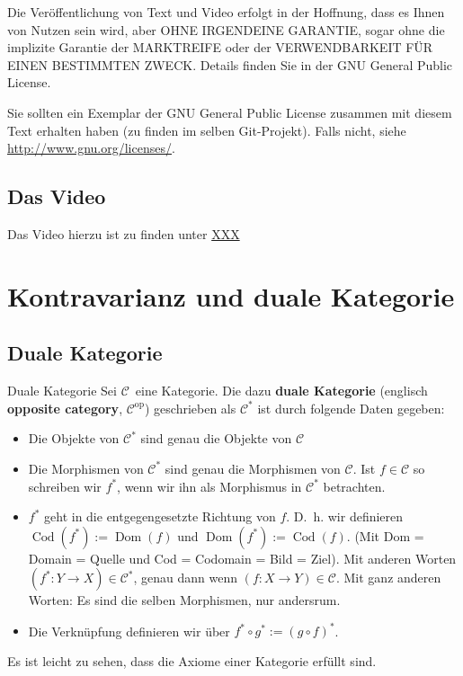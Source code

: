\documentclass[a4paper]{amsart}
\theoremstyle{definition}
\DeclareMathOperator{\Dom}{Dom}
\DeclareMathOperator{\Cod}{Cod}
\newcommand{\CC}{\ensuremath{\mathcal{ C }}}
\begin{document}
Die Veröffentlichung von Text und Video erfolgt in der Hoffnung, dass es Ihnen von Nutzen sein wird,
aber OHNE IRGENDEINE GARANTIE, sogar ohne die implizite Garantie der MARKTREIFE oder der
VERWENDBARKEIT FÜR EINEN BESTIMMTEN ZWECK. Details finden Sie in der GNU General Public License.

Sie sollten ein Exemplar der GNU General Public License zusammen mit diesem Text erhalten haben
(zu finden im selben Git-Projekt).
Falls nicht, siehe \url{http://www.gnu.org/licenses/}.

\subsection*{Das Video}
Das Video hierzu ist zu finden unter
{\tiny
   \url{XXX}
}

\section{Kontravarianz und duale Kategorie}

\subsection{Duale Kategorie}
\begin{Definition}{Duale Kategorie}
   Sei \CC\ eine Kategorie. Die dazu \textbf{duale Kategorie} (englisch \textbf{opposite category}, $\CC^\text{op}$) geschrieben als $\CC^*$ ist durch folgende Daten gegeben:
   \begin{itemize}
      \item Die Objekte von $\CC^*$ sind genau die Objekte von $\CC$
      \item Die Morphismen von $\CC^*$ sind genau die Morphismen von $\CC$. Ist $f \in \CC$ so schreiben wir $f^*$, wenn wir ihn als Morphismus in $\CC^*$ betrachten.
      \item $f^*$ geht in die entgegengesetzte Richtung von $f$. D.~h. wir definieren $\Cod(f^*) := \Dom(f)$ und $\Dom(f^*) := \Cod(f)$. (Mit Dom = Domain = Quelle und Cod = Codomain = Bild = Ziel). Mit anderen Worten $(f^* \colon Y \to X) \in \CC^*$, genau dann wenn $(f \colon X \to Y) \in \CC$. Mit ganz anderen Worten: Es sind die selben Morphismen, nur andersrum.
      \item Die Verknüpfung definieren wir über $f^* \circ g^* := (g \circ f)^*$.
   \end{itemize}
\end{Definition}   
Es ist leicht zu sehen, dass die Axiome einer Kategorie erfüllt sind.
\end{document}
